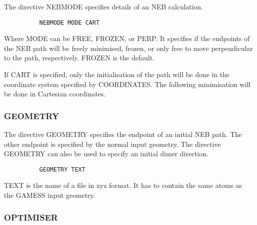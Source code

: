 \documentclass[11pt,fleqn]{article}
\begin{document}
The directive NEBMODE specifies details of an NEB calculation.

{
\footnotesize
\begin{verbatim}
          NEBMODE MODE CART
\end{verbatim}
} 

Where MODE can be FREE, FROZEN, or PERP. It specifies if the endpoints of the
NEB path will be freely minimised, frozen, or only free to move perpendicular
to the path, respectively. FROZEN is the default. 

If CART is specified, only the initialisation of the path will be done in the
coordinate system specified by COORDINATES. The following minimisation will be
done in Cartesian coordinates.

\subsubsection{GEOMETRY}

The directive GEOMETRY specifies the endpoint of an initial NEB path. The
other endpoint is specified by the normal input geometry. The directive
GEOMETRY can also be used to specify an initial dimer direction.

{
\footnotesize
\begin{verbatim}
          GEOMETRY TEXT
\end{verbatim}
} 

TEXT is the name of a file in xyz format. It has to contain the same atoms as
the GAMESS input geometry.

\subsubsection{OPTIMISER}
\end{document}

